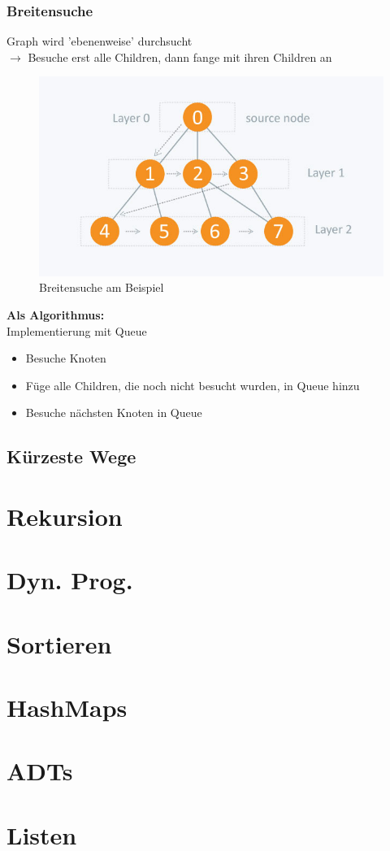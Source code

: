 \documentclass{article}
\begin{document}
	\subsubsection{Breitensuche}
	Graph wird 'ebenenweise' durchsucht
	\\$\rightarrow$ Besuche erst alle Children, dann fange mit ihren Children an
\begin{figure}[H]
	\centering
	\includegraphics[width=0.5\linewidth]{Abbildungen/breitensuche}
	\caption{Breitensuche am Beispiel}
	\label{fig:breitensuche}
\end{figure}
	\textbf{Als Algorithmus:}
	\\Implementierung mit Queue
	\begin{itemize}
		\item Besuche Knoten
		\item Füge alle Children, die noch nicht besucht wurden,  in Queue hinzu
		\item Besuche nächsten Knoten in Queue
	\end{itemize}
	\subsection{Kürzeste Wege}
	\section{Rekursion}
	\section{Dyn. Prog.}
	\section{Sortieren}
	\section{HashMaps}
	\section{ADTs}
	\section{Listen}
\end{document}
